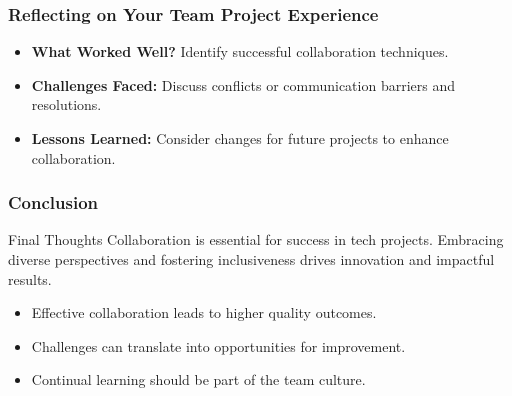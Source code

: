 \documentclass[aspectratio=169]{beamer}
\begin{document}
\begin{frame}[fragile]
    \frametitle{Reflecting on Your Team Project Experience}
    \begin{itemize}
        \item \textbf{What Worked Well?} Identify successful collaboration techniques.
        \item \textbf{Challenges Faced:} Discuss conflicts or communication barriers and resolutions.
        \item \textbf{Lessons Learned:} Consider changes for future projects to enhance collaboration.
    \end{itemize}
\end{frame}

\begin{frame}[fragile]
    \frametitle{Conclusion}
    \begin{block}{Final Thoughts}
        Collaboration is essential for success in tech projects. Embracing diverse perspectives and fostering inclusiveness drives innovation and impactful results. 
    \end{block}
    
    \begin{itemize}
        \item Effective collaboration leads to higher quality outcomes.
        \item Challenges can translate into opportunities for improvement.
        \item Continual learning should be part of the team culture.
    \end{itemize}
\end{frame}
\end{document}

